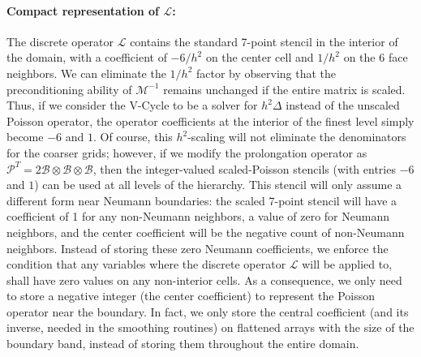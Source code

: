 \paragraph{Compact representation of $\mathcal{L}$:} The discrete operator $\mathcal{L}$ contains the standard 7-point stencil in the interior of the domain, with a
coefficient of $-6/h^2$ on the center cell and $1/h^2$ on the 6 face neighbors. We can eliminate the $1/h^2$ factor by observing that the preconditioning ability of $\mathcal{M}^{-1}$
remains unchanged if the entire matrix is scaled. Thus, if we consider the V-Cycle to be a solver for $h^2\Delta$ instead of the unscaled Poisson operator, the operator
coefficients at the interior of the finest level simply become $-6$ and $1$. 
Of course, this $h^2$-scaling will not eliminate the denominators for the coarser grids; however, if we
modify the prolongation operator as $\mathcal{P}^T\!=\!2\mathcal{B}\otimes\mathcal{B}\otimes\mathcal{B}$, then the integer-valued
scaled-Poisson stencils (with entries $-6$ and $1$) can be used at all levels of the hierarchy. This stencil will only assume a different form near Neumann boundaries: the scaled
7-point stencil will have a coefficient of 1 for any non-Neumann neighbors, a value of zero for Neumann neighbors, and the center coefficient will be the negative count of
non-Neumann neighbors. Instead of storing these zero Neumann coefficients, we enforce the condition that any variables where the discrete operator $\mathcal{L}$ will be applied to,
shall have zero values on any non-interior cells. As a consequence, we only need to store a negative integer (the center coefficient)  to represent the Poisson
operator near the boundary. 
In fact, we only store the central coefficient (and its inverse, needed in the smoothing routines) on flattened arrays with the size of the boundary
band, instead of storing them throughout the entire domain.

